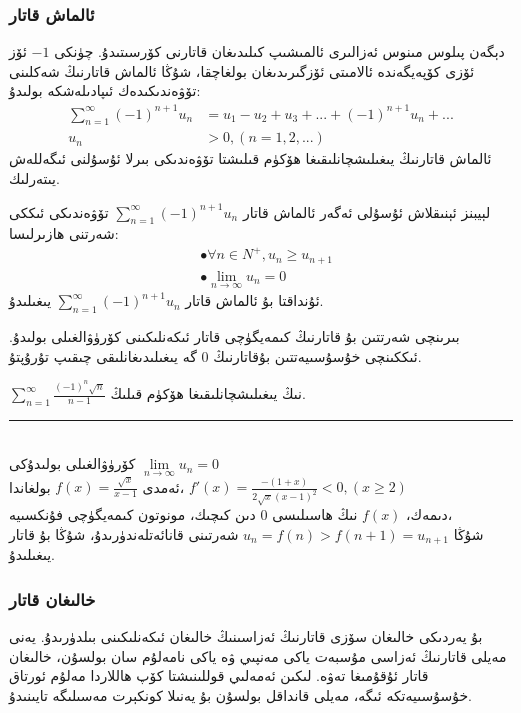 \subsubsection{ئالماش قاتار}
دېگەن پىلوس مىنوس ئەزالىرى ئالمىشىپ كىلىدىغان قاتارنى كۆرسىتىدۇ. چۈنكى 
$-1$
ئۆز ئۆزى كۆپەيگەندە ئالامىتى ئۆزگىرىدىغان بولغاچقا، شۇڭا ئالماش قاتارنىڭ شەكلىنى تۆۋەندىكىدەك ئىپادىلەشكە بولىدۇ:
\begin{align*}
\sum\limits_{n=1}^\infty (-1)^{n+1} u_n &= u_1-u_2+u_3+...+(-1)^{n+1}u_n+...\\
u_n &> 0, (n =1,2,...)
\end{align*}
ئالماش قاتارنىڭ يىغىلىشچانلىقىغا ھۆكۈم قىلىشتا تۆۋەندىكى بىرلا ئۇسۇلنى ئىگەللەش يىتەرلىك.
\begin{MyTheorem}{لېيبنز ئېنىقلاش ئۇسۇلى}{}%
	ئەگەر ئالماش قاتار
$\sum\limits_{n=1}^\infty (-1)^{n+1} u_n$
تۆۋەندىكى ئىككى شەرتنى ھازىرلىسا:
	\begin{align*}
		&\bullet \forall n \in N^{+}, u_{n} \ge u_{n+1} \\
		&\bullet \lim\limits_{n\to\infty} u_n = 0
	\end{align*}
ئۇنداقتا بۇ ئالماش قاتار $\sum\limits_{n=1}^\infty (-1)^{n+1} u_n$ يىغىلىدۇ.
\end{MyTheorem}

بىرىنچى شەرتتىن بۇ قاتارنىڭ كىمەيگۈچى قاتار ئىكەنلىكىنى كۆرۈۋالغىلى بولىدۇ. ئىككىنچى خۇسۇسىيەتتىن بۇقاتارنىڭ $0$ گە يىغىلىدىغانلىقى چىقىپ تۇرۇپتۇ.
\begin{myexample}
			$\sum\limits_{n=1}^{\infty} \frac{(-1)^n\sqrt{n}}{n-1}$
نىڭ يىغىلىشچانلىقىغا ھۆكۈم قىلىڭ.
\\\rule{\linewidth}{0.05em}\\
 كۆرۈۋالغىلى بولىدۇكى 
			$\lim\limits_{n\to\infty} u_n = 0$\\
ئەمدى 
			$f(x)=\frac{\sqrt{x}}{x-1}$
			بولغاندا،
			$f'(x)=\frac{-(1+x)}{2\sqrt{x}(x-1)^2}<0,(x \ge 2)$\\
			دىمەك، 
			$f(x)$
			نىڭ ھاسىلىسى $0$ دىن كىچىك، مونوتون كىمەيگۈچى فۇنكسىيە،\\شۇڭا 
			$u_{n} = f(n) > f(n+1) =  u_{n+1}$
			شەرتىنى قانائەتلەندۈرىدۇ، شۇڭا بۇ قاتار يىغىلىدۇ.
\end{myexample}

\subsubsection{خالىغان قاتار}
بۇ يەردىكى خالىغان سۆزى قاتارنىڭ ئەزاسىنىڭ خالىغان ئىكەنلىكىنى بىلدۈرىدۇ. يەنى مەيلى قاتارنىڭ ئەزاسى مۇسبەت ياكى مەنپىي ۋە ياكى نامەلۇم سان بولسۇن، خالىغان قاتار  ئۇقۇمىغا تەۋە. لىكىن ئەمەلىي قوللىنىشتا كۆپ ھاللاردا مەلۇم ئورتاق خۇسۇسىيەتكە ئىگە، مەيلى قانداقل بولسۇن بۇ يەنىلا كونكېرت مەسىلىگە تايىنىدۇ.


